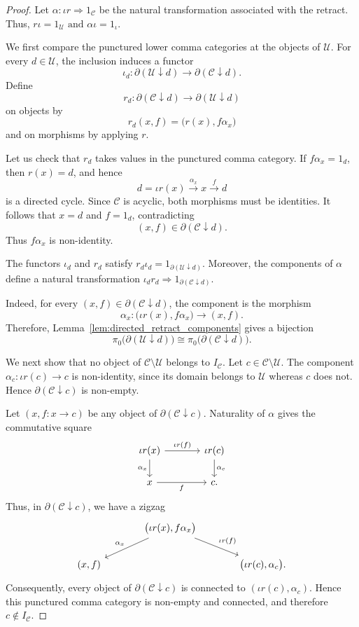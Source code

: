 \documentclass[12pt]{amsart}
\theoremstyle{definition}
\theoremstyle{remark}
\numberwithin{figure}{section}%
\newcommand{\CC}{\mathcal{C}}
\newcommand{\Uc}{\mathcal{U}}
\begin{document}
\begin{proof}
Let
\(
\alpha\colon\iota r\Rightarrow1_\CC
\)
be the natural transformation associated with the retract. Thus,
\(
r\iota=1_\Uc
\text{ and }
\alpha\iota=1_\iota.
\)

We first compare the punctured lower comma categories at the objects of
\(\Uc\). For every \(d\in\Uc\), the inclusion induces a functor
\[
\iota_d\colon
\partial(\Uc\downarrow d)
\longrightarrow
\partial(\CC\downarrow d).
\]
Define
\[
r_d\colon
\partial(\CC\downarrow d)
\longrightarrow
\partial(\Uc\downarrow d)
\]
on objects by
\[
r_d(x,f)
=
\bigl(r(x),f\alpha_x\bigr)
\]
and on morphisms by applying \(r\).

Let us check that \(r_d\) takes values in the punctured comma category.
If \(f\alpha_x=1_d\), then \(r(x)=d\), and hence
\[
d=\iota r(x)
\xrightarrow{\alpha_x}
x
\xrightarrow{f}
d
\]
is a directed cycle. Since \(\CC\) is acyclic, both morphisms must be
identities. It follows that \(x=d\) and \(f=1_d\), contradicting
\[
(x,f)\in\partial(\CC\downarrow d).
\]
Thus \(f\alpha_x\) is non-identity.

The functors \(\iota_d\) and \(r_d\) satisfy
\(
r_d\iota_d
=
1_{\partial(\Uc\downarrow d)}.
\)
Moreover, the components of \(\alpha\) define a natural transformation
\(
\iota_dr_d
\Rightarrow
1_{\partial(\CC\downarrow d)}.
\)

Indeed, for every \((x,f)\in\partial(\CC\downarrow d)\), the component is
the morphism
\[
\alpha_x\colon
\bigl(\iota r(x),f\alpha_x\bigr)
\longrightarrow
(x,f).
\]
Therefore, Lemma~\ref{lem:directed_retract_components} gives a bijection
\[
\pi_0\bigl(\partial(\Uc\downarrow d)\bigr)
\cong
\pi_0\bigl(\partial(\CC\downarrow d)\bigr).
\]

We next show that no object of \(\CC\setminus\Uc\) belongs to \(I_\CC\).
Let \(c\in\CC\setminus\Uc\). The component
\(
\alpha_c\colon\iota r(c)\longrightarrow c
\)
is non-identity, since its domain belongs to \(\Uc\) whereas \(c\) does
not. Hence \(\partial(\CC\downarrow c)\) is non-empty.

Let
\(
(x,f\colon x\to c)
\)
be any object of \(\partial(\CC\downarrow c)\). Naturality of \(\alpha\)
gives the commutative square
\[
\begin{tikzcd}[column sep=large]
\iota r(x)
  \arrow[r, "\iota r(f)"]
  \arrow[d, "\alpha_x"']
&
\iota r(c)
  \arrow[d, "\alpha_c"]
\\
x
  \arrow[r, "f"']
&
c.
\end{tikzcd}
\]
Thus, in \(\partial(\CC\downarrow c)\), we have a zigzag
\[
\begin{tikzcd}[column sep=large]
&
\bigl(\iota r(x),f\alpha_x\bigr)
  \arrow[dl, "\alpha_x"']
  \arrow[dr, "\iota r(f)"]
&
\\
(x,f)
&
&
\bigl(\iota r(c),\alpha_c\bigr).
\end{tikzcd}
\]
Consequently, every object of \(\partial(\CC\downarrow c)\) is connected
to \((\iota r(c),\alpha_c)\). Hence this punctured comma category is
non-empty and connected, and therefore
\(
c\notin I_\CC.
\)


\end{proof}
\end{document}
